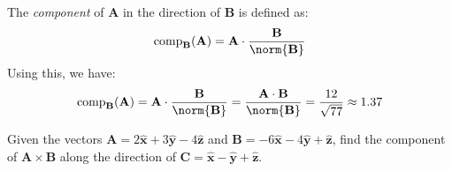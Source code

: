 \begin{solution}
\begin{equation}
                \end{equation}
                \par\hfill\par
                The \textit{component} of $\mathbf{A}$
                in the direction of
                $\mathbf{B}$ is defined as:
                \begin{equation}
                    \mathrm{comp}_{\mathbf{B}}(\mathbf{A})
                    =\mathbf{A}\cdot
                        \frac{\mathbf{B}}{\norm{\mathbf{B}}}
                \end{equation}
                Using this, we have:
                \begin{equation}
                    \mathrm{comp}_{\mathbf{B}}(\mathbf{A})
                    =\mathbf{A}\cdot
                        \frac{\mathbf{B}}{\norm{\mathbf{B}}}
                    =\frac{\mathbf{A}\cdot\mathbf{B}}
                        {\norm{\mathbf{B}}}
                    =\frac{12}{\sqrt{77}}
                    \approx{1.37}
                \end{equation}
            \end{solution}
            \begin{problem}
                Given the vectors
                $\mathbf{A}=2\hat{\mathbf{x}}%
                           +3\hat{\mathbf{y}}%
                           -4\hat{\mathbf{z}}$
                and
                $\mathbf{B}=\minus{6}\hat{\mathbf{x}}%
                                   -4\hat{\mathbf{y}}%
                                    +\hat{\mathbf{z}}$,
                find the component of
                $\mathbf{A}\times\mathbf{B}$
                along the direction of
                $\mathbf{C}=\hat{\mathbf{x}}%
                           -\hat{\mathbf{y}}%
                           +\hat{\mathbf{z}}$.
            \end{problem}
